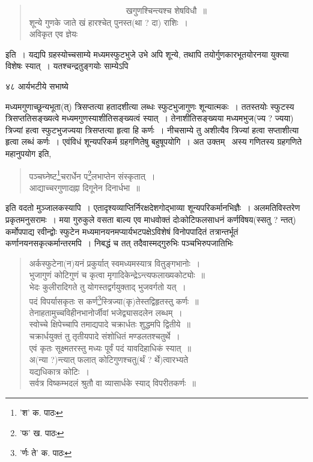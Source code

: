 \documentclass[11pt, openany]{book}
\begin{document}
{{{{{\begin{quote} 
~~~~~~~~~~~~~~~~~~~~~~~{\qt खगुणश्चिन्त्यश्च शेषविधौ~॥\\
 शून्ये गुणके जाते खं हारश्चेत् पुनस्त(था ? दा) राशिः~।\\
अविकृत एव ज्ञेयः}
\end{quote}

\noindent इति~। यद्यपि ग्रहस्योच्चसाम्ये मध्यमस्फुटभुजे उभे अपि शून्ये, तथापि तयोर्गुणकारभूतयोरनया युक्त्या विशेषः स्यात्~। यतश्चन्द्रतुङ्गयोः साम्येऽपि
\newpage

\vspace{3cm} ४८\hspace{4cm} आर्यभटीये सभाष्ये 

\vspace{0.3cm}
\noindent मध्यमगुणाच्छून्यभूता(त्) त्रिसप्तत्या हतादशीत्या लब्धः स्फुटभुजागुणः शून्यात्मकः~। ततस्तयोः स्फुटस्य त्रिसप्ततिसङ्ख्यत्वे मध्यमगुणस्याशीतिसङ्ख्यत्वं स्यात्~। तेनाशीतिसङ्ख्यया मध्यमभुज(ज्य ? ज्यया) त्रिज्यां हत्वा स्फुटभुजज्यया त्रिसप्तत्या हृत्वा हि कर्णः~। नीचसाम्ये तु अशीत्यैव त्रिज्यां हत्वा सप्ताशीत्या हृत्वा लब्धं कर्णः~। एवंविधं शून्यपरिकर्म ग्रहगणितेषु बहुषूपयोगि~। अत उक्तम्  \textendash\ अस्य गणितस्य ग्रहगणिते महानुपयोग इति,

\begin{quote}
{\qt पञ्चघ्नेष्ट\renewcommand{\thefootnote}{१}\footnote{'श' क. पाठः}चरार्धेन प\renewcommand{\thefootnote}{२}\footnote{'फ' ख. पाठः}लभाप्तेन संस्कृतात्~। \\
आद्याच्चरगुणादह्ना दिगूनेन दिनार्धभा~॥}
\end{quote}

\noindent इति वदतो मुञ्जालकस्यापि~। एतादृश्यव्याप्तिर्निरक्षदेशगोद्भाव्या शून्यपरिकर्मानभिज्ञैः~। अलमतिविस्तरेण प्रकृतमनुसरामः~। मया गुरुकुले वसता बाल्य एव माधवोक्तं दोःकोटिफलसाधनं कर्णविषय(स्सतु ? न्तत्) कर्मोपपाद्य रवीन्द्वोः स्फुटेन मध्यमानयनमप्यार्यभटपक्षेऽविशेषं विनोपपादितं तत्रान्तर्भूतं कर्णानयनसकृत्कर्मान्तरमपि~। निबद्धं च तत् तदैवास्मद्गुरुभिः पञ्चभिरुपजातिभिः \textendash 

\begin{quote}
{\qt अर्कस्फुटेना(न)यनं प्रकुर्यात् स्वमध्यमस्यात्र वितुङ्गभानोः~।\\
भुजागुणं कोटिगुणं च कृत्वा मृगादिकेन्द्रेऽन्त्यफलाख्यकोट्योः~॥\\
भेदः कुलीरादिगते तु योगस्तद्वर्गयुक्ताद् भुजवर्गतो यत्~।\\
पदं विपर्यासकृतः स कर्ण\renewcommand{\thefootnote}{३}\footnote{'र्णः ते' क. पाठः}स्त्रिज्या(कृ)तेस्तद्विहृतस्तु कर्णः~॥\\
तेनाहतामुच्चविहीनभानोर्जीवां भजेद्व्यासदलेन लब्धम्~।\\
स्वोच्चे क्षिपेच्चापि तमाद्यपादे चक्रार्धतः शुद्धमपि द्वितीये~॥\\
चक्रार्धयुक्तं तु तृतीयपादे संशोधितं मण्डलतश्चतुर्थे~।\\
एवं कृतः सूक्ष्मतरस्तु मध्यः पूर्वं पदं यावदिहाधिकं स्यात्~॥\\
अ(न्या ?)न्त्यात् फलात् कोटिगुणश्चतु(र्थं ? र्थे)त्वारभ्यते\\
यद्यधिकात्र कोटिः~।\\
सर्वत्र विष्कम्भदलं श्रुतौ वा व्यासार्धके स्याद् विपरीतकर्णः~॥}
\end{quote}

}}}}}
\end{document}
